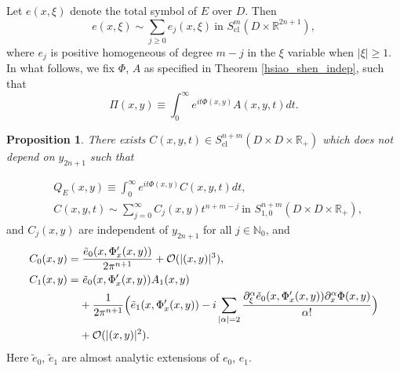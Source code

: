 \documentclass{article}
\newtheorem{proposition}[theorem]{Proposition}
\newcommand{\RR}{\mathbb R}
\newcommand{\NN}{\mathbb N}
\newcommand{\mco}{\mathcal O}
\DeclareMathOperator{\cl}{cl}
\begin{document}
Let $e(x,\xi)$ denote the total symbol of $E$ over $D$. Then
\begin{equation*} e(x,\xi) \sim \sum_{j \ge 0} e_j(x,\xi)\ \text{in } S^m_{\cl}(D\times \RR^{2n+1}),\end{equation*}
where $e_j$ is positive homogeneous of degree $m-j$ in the $\xi$ variable when $|\xi| \ge 1$. In what follows, we fix $\Phi$, $A$ as specified in Theorem \ref{hsiao_shen_indep}, such that $$\Pi(x,y) \equiv \int_0^\infty e^{it \Phi(x,y)}A(x,y,t) dt.$$
%
\begin{proposition}\label{Q_E_prop} There exists $C(x,y,t) \in S^{n+m}_{\cl}( D \times D \times \RR_+)$ which does not depend on $y_{2n+1}$ such that \end{proposition}
%
\begin{equation*} \begin{aligned} &Q_E(x,y) \equiv \int_0^\infty e^{it \Phi(x,y)} C(x,y,t) dt,\\ &C(x,y,t) \sim \sum_{j =0}^\infty C_{j}(x,y) t^{n+m-j}\ \text{in } S^{n+m}_{1,0}(D \times D \times \RR_+),\end{aligned}\end{equation*}
and $C_{j}(x,y)$ are independent of $y_{2n+1}$ for all $j \in \NN_0$, and
%
\begin{equation*} \begin{aligned}&C_{0}(x,y) = \frac{\tilde e_0(x, \Phi_x'(x,y))}{2\pi^{n+1}} + \mco(|(x,y)|^3),\\ & \begin{aligned} C_{1}(x,y) = &\ \tilde e_0(x, \Phi'_x(x,y)) A_1(x,y) \\ &+\frac 1 {2\pi^{n+1}}\Big{(} \tilde e_1(x,  \Phi'_x(x,y)) - i \sum_{|\alpha| = 2} \frac{\partial^\alpha_{\xi} \tilde e_0(x, \Phi'_x(x,y)) \partial^\alpha_{x} \Phi(x,y)}{\alpha!}\Big{)}\\ &+\mco(|(x,y)|^2).\end{aligned}\end{aligned}\end{equation*}
%
Here $\tilde e_0$, $\tilde e_1$ are almost analytic extensions of $e_0$, $e_1$.
%
\end{document}
